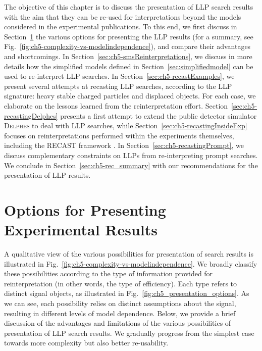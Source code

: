 The objective of this chapter is to discuss the presentation of  LLP search results  
with the aim that they can be re-used for interpretations beyond the models considered in the 
experimental publications.  
To this end, we first discuss in Section~\ref{sec:ch5-options} the various options 
for presenting the LLP results (for a summary, see Fig.~\ref{fig:ch5-complexity-vs-modelindependence}), and compare their advantages and
shortcomings. 
In Section~\ref{sec:ch5-smsReinterpretations}, we discuss in more details how the simplified models defined in Section~\ref{sec:simplifiedmodel} can be used to re-interpret LLP searches. 
In Section~\ref{sec:ch5-recastExamples}, we present several attempts at recasting LLP searches, 
according to the LLP signature: heavy stable charged particles and displaced objects. For each case, 
we elaborate on the lessons learned from the reinterpretation effort. 
Section~\ref{sec:ch5-recastingDelphes} presents a first attempt to
extend the public detector simulator \textsc{Delphes} %
to deal with LLP searches, while 
Section~\ref{sec:ch5-recastingInsideExp} focuses on reinterpretations performed within the experiments themselves, 
including the RECAST framework \cite{Cranmer:2010hk}.  
In Section~\ref{sec:ch5-recastingPrompt}, we discuss complementary constraints on LLPs from re-interpreting prompt searches. 
We conclude in Section~\ref{sec:ch5-rec_summary} with our %
recommendations for the presentation of LLP results. 


\section{Options for Presenting Experimental Results} 
\label{sec:ch5-options}

A qualitative view of the various possibilities for presentation
of search results is illustrated in
Fig.~\ref{fig:ch5-complexity-vs-modelindependence}.
We broadly classify these possibilities according to the type of
information provided for reinterpretation (in other words, the type of efficiency).
Each type refers to distinct signal objects, as illustrated in
Fig.~\ref{fig:ch5_presentation_options}.
As we can see, each possibility relies on distinct assumptions about
the signal, resulting in different levels of model dependence.
Below, we provide a brief discussion of the advantages and limitations of the
various possibilities of presentation of LLP search results.
We  gradually progress from the simplest case towards more complexity but
also better re-usability.

